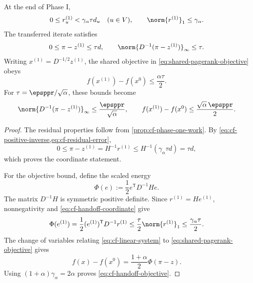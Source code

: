 \begin{proposition}
\label{prop:cf-handoff}
At the end of Phase I,
\begin{equation}
    0\leq r^{(1)}_u<\gamma_\alpha\tau d_u
    \quad(u\in V),
    \qquad
    \norm{r^{(1)}}_1\leq\gamma_\alpha.
    \label{eq:cf-handoff-residual}
\end{equation}
The transferred iterate satisfies
\begin{equation}
    0\leq \pi-z^{(1)}\leq\tau d,
    \qquad
    \norm{D^{-1}(\pi-z^{(1)})}_\infty\leq\tau.
    \label{eq:cf-handoff-coordinate}
\end{equation}
Writing \(x^{(1)}=D^{-1/2}z^{(1)}\), the shared objective in
\cref{eq:shared-pagerank-objective} obeys
\begin{equation}
    f(x^{(1)})-f(x^0)
    \leq\frac{\alpha\tau}{2}.
    \label{eq:cf-handoff-objective}
\end{equation}
For \(\tau=\epsppr/\sqrt\alpha\), these bounds become
\begin{equation}
    \norm{D^{-1}(\pi-z^{(1)})}_\infty
    \leq\frac{\epsppr}{\sqrt\alpha},
    \qquad
    f(x^{(1)})-f(x^0)
    \leq\frac{\sqrt\alpha\,\epsppr}{2}.
    \label{eq:cf-handoff-at-switch}
\end{equation}
\end{proposition}

\begin{proof}
The residual properties follow from
\cref{prop:cf-phase-one-work}.  By
\cref{eq:cf-positive-inverse,eq:cf-residual-error},
\begin{equation}
    0\leq \pi-z^{(1)}
    =H^{-1}r^{(1)}
    \leq H^{-1}(\gamma_\alpha\tau d)
    =\tau d,
    \label{eq:cf-handoff-inverse-proof}
\end{equation}
which proves the coordinate statement.

For the objective bound, define the scaled energy
\begin{equation}
    \Phi(e):=\frac12e^\mathsf{T}D^{-1}He.
    \label{eq:cf-energy}
\end{equation}
The matrix \(D^{-1}H\) is symmetric positive definite.  Since
\(r^{(1)}=He^{(1)}\), nonnegativity and
\cref{eq:cf-handoff-coordinate} give
\begin{equation}
    \Phi(e^{(1)})
    =\frac12(e^{(1)})^\mathsf{T}D^{-1}r^{(1)}
    \leq\frac{\tau}{2}\norm{r^{(1)}}_1
    \leq\frac{\gamma_\alpha\tau}{2}.
    \label{eq:cf-handoff-energy}
\end{equation}
The change of variables relating \cref{eq:cf-linear-system} to
\cref{eq:shared-pagerank-objective} gives
\begin{equation}
    f(x)-f(x^0)
    =\frac{1+\alpha}{2}\Phi(\pi-z).
    \label{eq:cf-objective-energy-relation}
\end{equation}
Using \((1+\alpha)\gamma_\alpha=2\alpha\) proves
\cref{eq:cf-handoff-objective}.
\end{proof}

